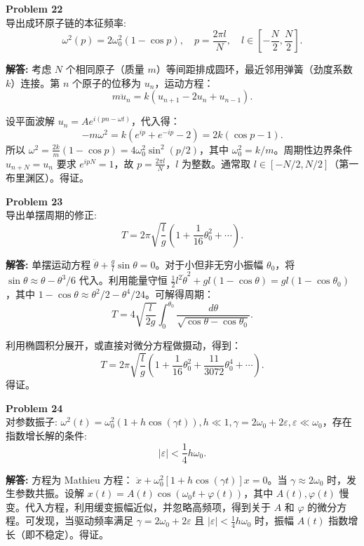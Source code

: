 \documentclass[12pt, a4paper, oneside]{ctexart}
\newenvironment{solution}{\par\noindent\textbf{解答:}\quad}{\par}
\begin{document}
\begin{mdframed}[backgroundcolor=gray!10, linewidth=0pt]
    \textbf{Problem 22} \\
    导出成环原子链的本征频率:
    \[
    \omega^2(p) = 2\omega_0^2(1 - \cos p), \quad p = \frac{2\pi l}{N}, \quad l \in \left[-\frac{N}{2}, \frac{N}{2}\right].
    \]
\end{mdframed}
\begin{solution}
    考虑 \(N\) 个相同原子（质量 \(m\)）等间距排成圆环，最近邻用弹簧（劲度系数 \(k\)）连接。第 \(n\) 个原子的位移为 \(u_n\)，运动方程：
    \[
    m \ddot{u}_n = k(u_{n+1} - 2u_n + u_{n-1}).
    \]
    
    设平面波解 \(u_n = A e^{i(p n - \omega t)}\)，代入得：
    \[
    -m \omega^2 = k (e^{ip} + e^{-ip} - 2) = 2k (\cos p - 1).
    \]
    所以 \(\omega^2 = \frac{2k}{m} (1 - \cos p) = 4 \omega_0^2 \sin^2(p/2)\)，其中 \(\omega_0^2 = k/m\)。周期性边界条件 \(u_{n+N} = u_n\) 要求 \(e^{i p N} = 1\)，故 \(p = \frac{2\pi l}{N}\)，\(l\) 为整数。通常取 \(l \in [-N/2, N/2]\)（第一布里渊区）。得证。
\end{solution}

\begin{mdframed}[backgroundcolor=gray!10, linewidth=0pt]
    \textbf{Problem 23} \\
    导出单摆周期的修正:
    \[
    T = 2\pi\sqrt{\frac{l}{g}} \left(1 + \frac{1}{16} \theta_0^2 + \cdots\right).
    \]
\end{mdframed}
\begin{solution}
    单摆运动方程 \(\ddot{\theta} + \frac{g}{l} \sin\theta = 0\)。对于小但非无穷小振幅 \(\theta_0\)，将 \(\sin\theta \approx \theta - \theta^3/6\) 代入。利用能量守恒 \(\frac{1}{2} l^2 \dot{\theta}^2 + g l (1-\cos\theta) = g l (1-\cos\theta_0)\)，其中 \(1-\cos\theta \approx \theta^2/2 - \theta^4/24\)。可解得周期：
    \[
    T = 4 \sqrt{\frac{l}{2g}} \int_0^{\theta_0} \frac{d\theta}{\sqrt{\cos\theta - \cos\theta_0}}.
    \]
    
    利用椭圆积分展开，或直接对微分方程做摄动，得到：
    \[
    T = 2\pi \sqrt{\frac{l}{g}} \left( 1 + \frac{1}{16} \theta_0^2 + \frac{11}{3072} \theta_0^4 + \cdots \right).
    \]
    得证。
\end{solution}

\begin{mdframed}[backgroundcolor=gray!10, linewidth=0pt]
    \textbf{Problem 24} \\
    对参数振子: \(\omega^2(t)=\omega_0^2(1+h\cos(\gamma t)), h\ll 1,\gamma=2\omega_0+2\varepsilon,\varepsilon\ll\omega_0\)，存在指数增长解的条件:
    \[
    |\varepsilon| < \frac{1}{4} h\omega_0.
    \]
\end{mdframed}
\begin{solution}
    方程为 Mathieu 方程： \(\ddot{x} + \omega_0^2 [1 + h \cos(\gamma t)] x = 0\)。当 \(\gamma \approx 2\omega_0\) 时，发生参数共振。设解 \(x(t) = A(t) \cos(\omega_0 t + \varphi(t))\)，其中 \(A(t), \varphi(t)\) 慢变。代入方程，利用缓变振幅近似，并忽略高频项，得到关于 \(A\) 和 \(\varphi\) 的微分方程。可发现，当驱动频率满足 \(\gamma = 2\omega_0 + 2\varepsilon\) 且 \(|\varepsilon| < \frac{1}{4} h \omega_0\) 时，振幅 \(A(t)\) 指数增长（即不稳定）。得证。
\end{solution}
\end{document}
